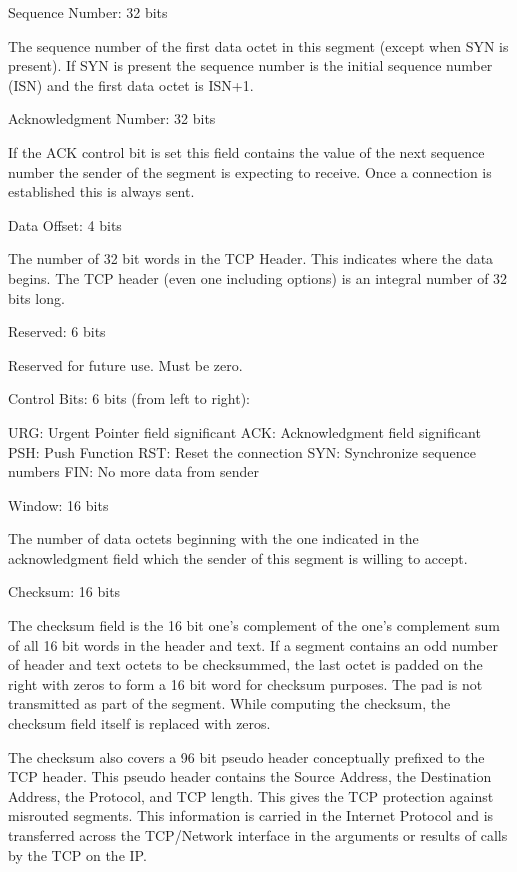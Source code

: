 \documentclass[11pt]{article}
\begin{document}
Sequence Number: 32 bits

    The sequence number of the first data octet in this segment (except
    when SYN is present). If SYN is present the sequence number is the
    initial sequence number (ISN) and the first data octet is ISN+1.

Acknowledgment Number:  32 bits

    If the ACK control bit is set this field contains the value of the
    next sequence number the sender of the segment is expecting to
    receive.  Once a connection is established this is always sent.

Data Offset:  4 bits

    The number of 32 bit words in the TCP Header.  This indicates where
    the data begins.  The TCP header (even one including options) is an
    integral number of 32 bits long.

Reserved:  6 bits

    Reserved for future use.  Must be zero.

Control Bits:  6 bits (from left to right):

    URG:  Urgent Pointer field significant
    ACK:  Acknowledgment field significant
    PSH:  Push Function
    RST:  Reset the connection
    SYN:  Synchronize sequence numbers
    FIN:  No more data from sender

Window:  16 bits

    The number of data octets beginning with the one indicated in the
    acknowledgment field which the sender of this segment is willing to
    accept.

Checksum:  16 bits

    The checksum field is the 16 bit one's complement of the one's
    complement sum of all 16 bit words in the header and text.  If a
    segment contains an odd number of header and text octets to be
    checksummed, the last octet is padded on the right with zeros to
    form a 16 bit word for checksum purposes.  The pad is not
    transmitted as part of the segment.  While computing the checksum,
    the checksum field itself is replaced with zeros.

    The checksum also covers a 96 bit pseudo header conceptually
    prefixed to the TCP header.  This pseudo header contains the Source
    Address, the Destination Address, the Protocol, and TCP length.
    This gives the TCP protection against misrouted segments.  This
    information is carried in the Internet Protocol and is transferred
    across the TCP/Network interface in the arguments or results of
    calls by the TCP on the IP.
\end{document}
